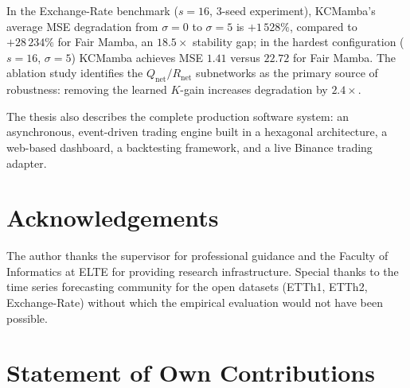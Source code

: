 \documentclass[
]{elteikthesis}[2024/04/26]
\begin{document}
In the Exchange-Rate benchmark ($s=16$, 3-seed experiment), KCMamba's average
MSE degradation from $\sigma{=}0$ to $\sigma{=}5$ is $+1\,528\%$, compared
to $+28\,234\%$ for Fair Mamba, an $18.5\times$ stability gap; in the
hardest configuration ($s{=}16$, $\sigma{=}5$) KCMamba achieves MSE $1.41$
versus $22.72$ for Fair Mamba. The ablation study identifies the
$Q_\text{net}/R_\text{net}$ subnetworks as the primary source of robustness:
removing the learned $K$-gain increases degradation by $2.4\times$.

The thesis also describes the complete production software system: an
asynchronous, event-driven trading engine built in a hexagonal architecture,
a web-based dashboard, a backtesting framework, and a live Binance
trading adapter.

\cleardoublepage

\tableofcontents
\cleardoublepage



\cleardoublepage


\cleardoublepage


\cleardoublepage


\cleardoublepage


\cleardoublepage

\chapter*{Acknowledgements}
The author thanks the supervisor for professional guidance and the
Faculty of Informatics at ELTE for providing research infrastructure.
Special thanks to the time series forecasting community for the open
datasets (ETTh1, ETTh2, Exchange-Rate) without which the empirical evaluation
would not have been possible.

\chapter*{Statement of Own Contributions}
\end{document}
